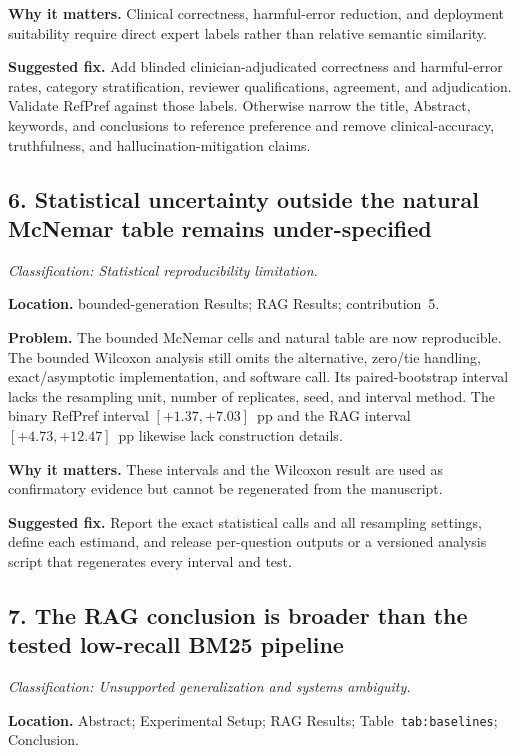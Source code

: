 \documentclass[11pt]{article}
\newcommand{\findinglabel}[1]{\textbf{#1}}
\newcommand{\classification}[1]{\textit{Classification: #1.}}
\begin{document}
\findinglabel{Why it matters.} Clinical correctness, harmful-error reduction, and deployment suitability require direct expert labels rather than relative semantic similarity.

\findinglabel{Suggested fix.} Add blinded clinician-adjudicated correctness and harmful-error rates, category stratification, reviewer qualifications, agreement, and adjudication.  Validate RefPref against those labels.  Otherwise narrow the title, Abstract, keywords, and conclusions to reference preference and remove clinical-accuracy, truthfulness, and hallucination-mitigation claims.

\subsection*{6. Statistical uncertainty outside the natural McNemar table remains under-specified}

\classification{Statistical reproducibility limitation}

\findinglabel{Location.} bounded-generation Results; RAG Results; contribution~5.

\findinglabel{Problem.} The bounded McNemar cells and natural table are now reproducible.  The bounded Wilcoxon analysis still omits the alternative, zero/tie handling, exact/asymptotic implementation, and software call.  Its paired-bootstrap interval lacks the resampling unit, number of replicates, seed, and interval method.  The binary RefPref interval $[+1.37,+7.03]$~pp and the RAG interval $[+4.73,+12.47]$~pp likewise lack construction details.

\findinglabel{Why it matters.} These intervals and the Wilcoxon result are used as confirmatory evidence but cannot be regenerated from the manuscript.

\findinglabel{Suggested fix.} Report the exact statistical calls and all resampling settings, define each estimand, and release per-question outputs or a versioned analysis script that regenerates every interval and test.

\subsection*{7. The RAG conclusion is broader than the tested low-recall BM25 pipeline}

\classification{Unsupported generalization and systems ambiguity}

\findinglabel{Location.} Abstract; Experimental Setup; RAG Results; Table~\texttt{tab:baselines}; Conclusion.
\end{document}
